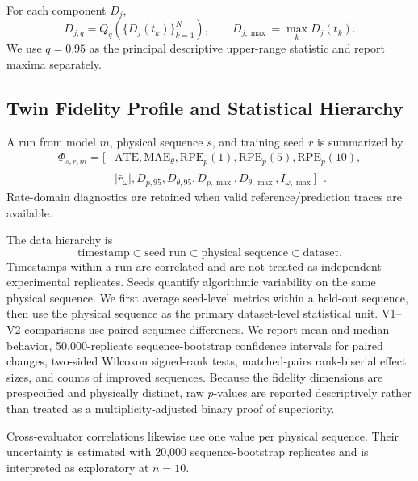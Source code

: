 \documentclass[journal]{IEEEtran}
\begin{document}
For each component $D_j$,
\begin{equation}
D_{j,q}=Q_q\!\left(\{D_j(t_k)\}_{k=1}^{N}\right),\qquad
D_{j,\max}=\max_k D_j(t_k).
\end{equation}
We use $q=0.95$ as the principal descriptive upper-range statistic and report maxima separately.

\subsection{Twin Fidelity Profile and Statistical Hierarchy}
A run from model $m$, physical sequence $s$, and training seed $r$ is summarized by
\begin{equation}
\begin{split}
\Phi_{s,r,m}=[&\mathrm{ATE},\mathrm{MAE}_\theta,\mathrm{RPE}_p(1),\mathrm{RPE}_p(5),\mathrm{RPE}_p(10),\\
&|\bar r_\omega|,D_{p,95},D_{\theta,95},D_{p,\max},D_{\theta,\max},I_{\omega,\max}]^{\top}.
\end{split}
\end{equation}
Rate-domain diagnostics are retained when valid reference/prediction traces are available.

The data hierarchy is
\begin{equation}
\text{timestamp}\subset\text{seed run}\subset\text{physical sequence}\subset\text{dataset}.
\end{equation}
Timestamps within a run are correlated and are not treated as independent experimental replicates. Seeds quantify algorithmic variability on the same physical sequence. We first average seed-level metrics within a held-out sequence, then use the physical sequence as the primary dataset-level statistical unit. V1--V2 comparisons use paired sequence differences. We report mean and median behavior, 50,000-replicate sequence-bootstrap confidence intervals for paired changes, two-sided Wilcoxon signed-rank tests, matched-pairs rank-biserial effect sizes, and counts of improved sequences. Because the fidelity dimensions are prespecified and physically distinct, raw $p$-values are reported descriptively rather than treated as a multiplicity-adjusted binary proof of superiority.

Cross-evaluator correlations likewise use one value per physical sequence. Their uncertainty is estimated with 20,000 sequence-bootstrap replicates and is interpreted as exploratory at $n=10$.
\end{document}
